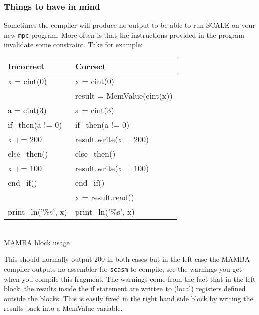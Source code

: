 \subsubsection{Things to have in mind}
Sometimes the compiler will produce no output to be able to run SCALE on your
new \verb+mpc+ program. More often is that the instructions provided in the
program invalidate some constraint. Take for example:

\begin{center}
\begin{tabular}{|l|l|} \hline
\textbf{Incorrect}                        & \textbf{Correct}                       \\ \hline
x = cint(0)                              & x = cint(0) \\
    &   result = MemValue(cint(x)) \\
a = cint(3)                             & a = cint(3) \\
if_then(a != 0) & if_then(a != 0) \\
x += 200 & result.write(x + 200) \\
else_then() & else_then() \\
x += 100 & result.write(x + 100) \\
end_if() & end_if() \\
    & x = result.read() \\
print_ln('\%s', x) & print_ln('\%s', x) \\ \hline
\end{tabular}
\begin{footnotesize}
\\ MAMBA block usage
\end{footnotesize}
\end{center}
This should normally output $200$ in both cases but in the 
left case the MAMBA compiler outputs no assembler for \verb+scasm+
to compile; see the warnings you get when you compile this fragment.
The warnings come from the fact that in the left block, 
the results inside the if statement are written to (local)
registers defined outside the blocks. This is easily fixed in the right hand
side block by writing the results back into a MemValue variable.
